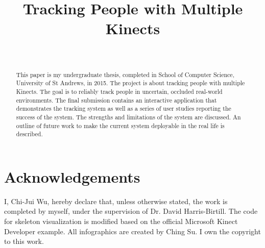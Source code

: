 \documentclass{sigchi}
\begin{document}
\title{Tracking People with Multiple Kinects}

\author{%
  \\
}

\maketitle

\begin{abstract}
This paper is my undergraduate thesis, completed in School of Computer Science, University of St Andrews, in 2015. The project is about tracking people with multiple Kinects. The goal is to reliably track people in uncertain, occluded real-world environments. The final submission contains an interactive application that demonstrates the tracking system as well as a series of user studies reporting the success of the system. The strengths and limitations of the system are discussed. An outline of future work to make the current system deployable in the real life is described.

\end{abstract}

























\section{Acknowledgements}
\label{sec:acknowledge}

I, Chi-Jui Wu, hereby declare that, unless otherwise stated, the work is completed by myself, under the supervision of Dr. David Harris-Birtill. The code for skeleton visualization is modified based on the official Microsoft Kinect Developer example.
All infographics are created by Ching Su. I own the copyright to this work.

\balance{}





\end{document}
